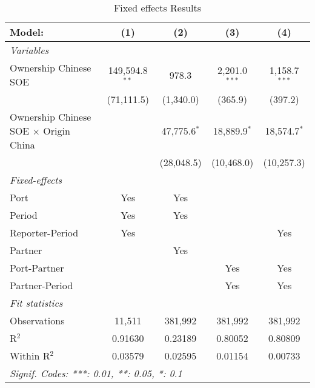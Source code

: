 \begin{table}[htbp]    \caption{Fixed effects Results}    \centering    \begin{adjustbox}{width = \textwidth, center}       \begin{tabular}{lcccc}          \tabularnewline \midrule \midrule          Model:                                       & (1)              & (2)            & (3)             & (4)\\            \midrule          \emph{Variables}\\          Ownership Chinese SOE                        & 149,594.8$^{**}$ & 978.3          & 2,201.0$^{***}$ & 1,158.7$^{***}$\\                                                          & (71,111.5)       & (1,340.0)      & (365.9)         & (397.2)\\             Ownership Chinese SOE $\times$ Origin China  &                  & 47,775.6$^{*}$ & 18,889.9$^{*}$  & 18,574.7$^{*}$\\                                                          &                  & (28,048.5)     & (10,468.0)      & (10,257.3)\\             \midrule          \emph{Fixed-effects}\\          Port                                         & Yes              & Yes            &                 & \\            Period                                       & Yes              & Yes            &                 & \\            Reporter-Period                              & Yes              &                &                 & Yes\\            Partner                                      &                  & Yes            &                 & \\            Port-Partner                                 &                  &                & Yes             & Yes\\            Partner-Period                               &                  &                & Yes             & Yes\\            \midrule          \emph{Fit statistics}\\          Observations                                 & 11,511           & 381,992        & 381,992         & 381,992\\            R$^2$                                        & 0.91630          & 0.23189        & 0.80052         & 0.80809\\            Within R$^2$                                 & 0.03579          & 0.02595        & 0.01154         & 0.00733\\            \midrule \midrule          \multicolumn{5}{l}{\emph{Signif. Codes: ***: 0.01, **: 0.05, *: 0.1}}\\       \end{tabular}    \end{adjustbox} \end{table}